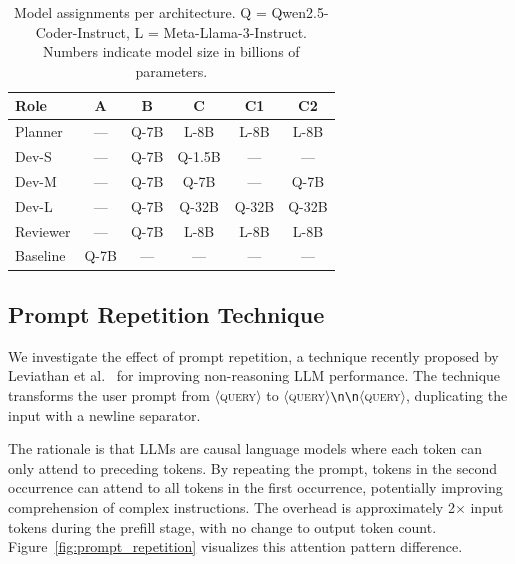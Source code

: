 \begin{table}[ht]
    \centering
    \footnotesize
    \setlength{\tabcolsep}{4pt}
    \begin{tabular}{l|ccccc}
        \toprule
        \textbf{Role} & \textbf{A} & \textbf{B} & \textbf{C} & \textbf{C1} & \textbf{C2} \\
        \midrule
        Planner  & ---  & Q-7B  & L-8B   & L-8B   & L-8B \\
        Dev-S    & ---  & Q-7B  & Q-1.5B & ---    & --- \\
        Dev-M    & ---  & Q-7B  & Q-7B   & ---    & Q-7B \\
        Dev-L    & ---  & Q-7B  & Q-32B  & Q-32B  & Q-32B \\
        Reviewer & ---  & Q-7B  & L-8B   & L-8B   & L-8B \\
        Baseline & Q-7B & ---   & ---    & ---    & --- \\
        \bottomrule
    \end{tabular}
    \caption{Model assignments per architecture. Q = Qwen2.5-Coder-Instruct, L = Meta-Llama-3-Instruct. Numbers indicate model size in billions of parameters.}
    \label{tab:model_config}
\end{table}

\subsection{Prompt Repetition Technique}
\label{subsec:prompt_repetition}

We investigate the effect of prompt repetition, a technique recently proposed by Leviathan et al.~\cite{leviathan2025prompt} for improving non-reasoning LLM performance. The technique transforms the user prompt from $\langle$\textsc{query}$\rangle$ to $\langle$\textsc{query}$\rangle$\texttt{\textbackslash n\textbackslash n}$\langle$\textsc{query}$\rangle$, duplicating the input with a newline separator.

The rationale is that LLMs are causal language models where each token can only attend to preceding tokens. By repeating the prompt, tokens in the second occurrence can attend to all tokens in the first occurrence, potentially improving comprehension of complex instructions. The overhead is approximately 2$\times$ input tokens during the prefill stage, with no change to output token count. Figure~\ref{fig:prompt_repetition} visualizes this attention pattern difference.

